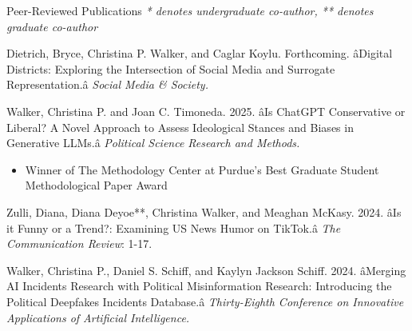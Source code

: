\documentclass{resume} %
\begin{document}
\begin{rSection}{Peer-Reviewed Publications} \textit{* denotes undergraduate co-author, ** denotes graduate co-author}
\begin{etaremune}

\item Dietrich, Bryce, Christina P. Walker, and Caglar Koylu. Forthcoming. âDigital Districts: Exploring the Intersection of Social Media and Surrogate Representation.â \textit{Social Media \& Society.}

\item Walker, Christina P. and Joan C. Timoneda. 2025. âIs ChatGPT Conservative or Liberal? A Novel Approach to Assess Ideological Stances and Biases in Generative LLMs.â \textit{Political Science Research and Methods.}\href{https://doi.org/10.1017/psrm.2025.10057}{}
\begin{itemize}
    \item Winner of The Methodology Center at Purdue's Best Graduate Student Methodological Paper Award 
\end{itemize}

\item Zulli, Diana, Diana Deyoe**, Christina Walker, and Meaghan McKasy. 2024. âIs it Funny or a Trend?: Examining US News Humor on TikTok.â \textit{The Communication Review}: 1-17.\href{https://doi.org/10.1080/10714421.2024.2359802}{ }

\item Walker, Christina P., Daniel S. Schiff, and Kaylyn Jackson Schiff. 2024. âMerging AI Incidents Research with Political Misinformation Research: Introducing the Political Deepfakes Incidents Database.â \textit{Thirty-Eighth Conference on Innovative Applications of Artificial Intelligence.}\href{https://ojs.aaai.org/index.php/AAAI/article/view/30349/32389}{ }


\end{etaremune}
\end{rSection}
\end{document}
